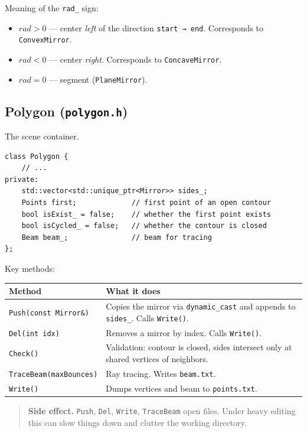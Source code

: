 \documentclass[a4paper,11pt]{article}
\newcommand{\file}[1]{\texttt{#1}}
\newcommand{\code}[1]{\texttt{#1}}
\begin{document}
Meaning of the \code{rad\_} sign:
\begin{itemize}[leftmargin=*]
    \item $rad > 0$ — center \emph{left} of the direction
          \code{start → end}. Corresponds to \code{ConvexMirror}.
    \item $rad < 0$ — center \emph{right}. Corresponds to
          \code{ConcaveMirror}.
    \item $rad = 0$ — segment (\code{PlaneMirror}).
\end{itemize}

\subsection{Polygon (\file{polygon.h})}

The scene container.

\begin{lstlisting}[caption={Polygon fields}]
class Polygon {
    // ...
private:
    std::vector<std::unique_ptr<Mirror>> sides_;
    Points first;             // first point of an open contour
    bool isExist_ = false;    // whether the first point exists
    bool isCycled_ = false;   // whether the contour is closed
    Beam beam_;               // beam for tracing
};
\end{lstlisting}

Key methods:

\begin{longtable}{@{}p{5.5cm}p{9cm}@{}}
\toprule
\textbf{Method} & \textbf{What it does} \\ \midrule
\endhead
\code{Push(const Mirror\&)} & Copies the mirror via \code{dynamic\_cast} and appends to \code{sides\_}. Calls \code{Write()}. \\
\code{Del(int idx)} & Removes a mirror by index. Calls \code{Write()}. \\
\code{Check()} & Validation: contour is closed, sides intersect only at shared vertices of neighbors. \\
\code{TraceBeam(maxBounces)} & Ray tracing. Writes \file{beam.txt}. \\
\code{Write()} & Dumps vertices and beam to \file{points.txt}. \\
\bottomrule
\end{longtable}

\begin{quote}
\textbf{Side effect.} \code{Push}, \code{Del}, \code{Write},
\code{TraceBeam} open files. Under heavy editing this can slow things
down and clutter the working directory.
\end{quote}
\end{document}

